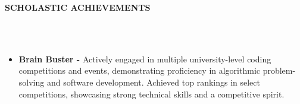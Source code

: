 \documentclass[a4paper,10pt]{article}
\newcommand{\lsep}{-0.5cm}
\newcommand{\resheading}[1]{{\small \colorbox{mygrey}{\begin{minipage}{0.975\textwidth}{\textbf{#1 \vphantom{p\^{E}}}}\end{minipage}}}}
\begin{document}
\resheading{\textbf{SCHOLASTIC ACHIEVEMENTS} }\\[\lsep]
\\
\begin{itemize}
\setlength\itemsep{0em}
\item \noindent\textbf{Brain Buster - } Actively engaged in multiple university-level coding competitions and events, demonstrating proficiency in algorithmic problem-solving and software development. Achieved top rankings in select competitions, showcasing strong technical skills and a competitive spirit.
\end{itemize}
\end{document}
